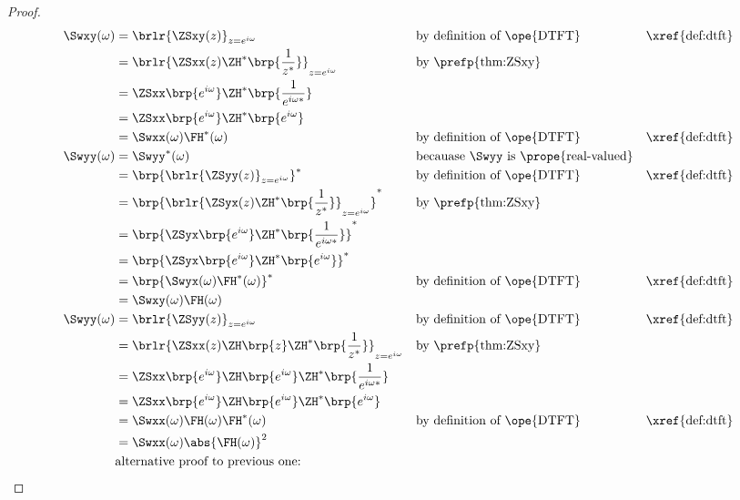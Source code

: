 \begin{proof}
\begin{align*}
   \Swxy(\omega)
     &= \brlr{\ZSxy(z)}_{z=e^{i\omega}}
     && \text{by definition of \ope{DTFT}}
     && \text{\xref{def:dtft}}
   \\&= \brlr{\ZSxx(z)\ZH^\ast\brp{\frac{1}{z^\ast}}}_{z=e^{i\omega}}
     && \text{by \prefp{thm:ZSxy}}
   \\&= \ZSxx\brp{e^{i\omega}}\ZH^\ast\brp{\frac{1}{e^{i\omega\ast}}}
   \\&= \ZSxx\brp{e^{i\omega}}\ZH^\ast\brp{e^{i\omega}}
   \\&= \Swxx(\omega) \FH^\ast(\omega)
     && \text{by definition of \ope{DTFT}}
     && \text{\xref{def:dtft}}
   \\
   \Swyy(\omega)
     &= \Swyy^\ast(\omega)
     && \text{becauase $\Swyy$ is \prope{real-valued}}
   \\&= \brp{\brlr{\ZSyy(z)}_{z=e^{i\omega}}}^\ast
     && \text{by definition of \ope{DTFT}}
     && \text{\xref{def:dtft}}
   \\&= \brp{\brlr{\ZSyx(z)\ZH^\ast\brp{\frac{1}{z^\ast}}}_{z=e^{i\omega}}}^\ast
     && \text{by \prefp{thm:ZSxy}}
   \\&= \brp{\ZSyx\brp{e^{i\omega}} \ZH^\ast\brp{\frac{1}{e^{i\omega\ast}}}}^\ast
   \\&= \brp{\ZSyx\brp{e^{i\omega}} \ZH^\ast\brp{e^{i\omega}}}^\ast
   \\&= \brp{\Swyx(\omega) \FH^\ast(\omega)}^\ast
     && \text{by definition of \ope{DTFT}}
     && \text{\xref{def:dtft}}
   \\&= \Swxy(\omega) \FH(\omega)
   \\
   \Swyy(\omega)
     &= \brlr{\ZSyy(z)}_{z=e^{i\omega}}
     && \text{by definition of \ope{DTFT}}
     && \text{\xref{def:dtft}}
   \\&= \brlr{\ZSxx(z)\ZH\brp{z} \ZH^\ast\brp{\frac{1}{z^\ast}}}_{z=e^{i\omega}}
     && \text{by \prefp{thm:ZSxy}}
   \\&= \ZSxx\brp{e^{i\omega}} \ZH\brp{e^{i\omega}} \ZH^\ast\brp{\frac{1}{e^{i\omega\ast}}}
   \\&= \ZSxx\brp{e^{i\omega}} \ZH\brp{e^{i\omega}} \ZH^\ast\brp{e^{i\omega}}
   \\&= \Swxx(\omega) \FH(\omega) \FH^\ast(\omega)
     && \text{by definition of \ope{DTFT}}
     && \text{\xref{def:dtft}}
   \\&= \Swxx(\omega) \abs{\FH(\omega)}^2
   \\
     &\text{alternative proof to previous one:}

\end{align*}
\end{proof}
